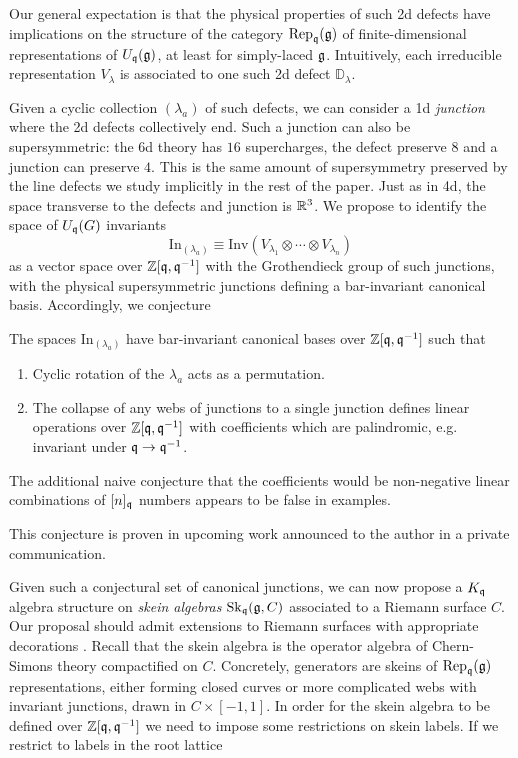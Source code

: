 \documentclass[12pt]{amsart}
\begin{document}
Our general expectation is that the physical properties of such 2d defects have implications on the structure of the category $\mathrm{Rep}_{\mathfrak{q}}(\mathfrak{g})$ 
of finite-dimensional representations of $U_{\mathfrak{q}}(\mathfrak{g})$, at least for simply-laced $\mathfrak{g}$. Intuitively, each irreducible representation $V_\lambda$ is associated to one such 2d defect $\mathbb{D}_\lambda$.   

Given a cyclic collection $(\lambda_a)$ of such defects, we can consider a 1d {\it junction} where the 2d defects collectively end. Such a junction can also be supersymmetric: the 6d theory has $16$ supercharges, the defect preserve $8$ and a junction can preserve $4$. This is the same amount of supersymmetry preserved by the line defects we study implicitly in the rest of the paper. Just as in 4d, the space transverse to the 
defects and junction is $\mathbb{R}^3$. We propose to identify the space of $U_{\mathfrak{q}}(G)$ invariants
\begin{equation}
	\mathrm{In}_{(\lambda_a)} \equiv \mathrm{Inv}\left(V_{\lambda_1} \otimes \cdots \otimes V_{\lambda_n} \right)
\end{equation}
as a vector space over $\mathbb{Z}[\mathfrak{q},\mathfrak{q}^{-1}]$ with the Grothendieck group of such junctions, with the physical supersymmetric junctions 
defining a bar-invariant canonical basis. Accordingly, we conjecture
\begin{conjecture}\label{conj:junctions}
The spaces $\mathrm{In}_{(\lambda_a)}$ have bar-invariant canonical bases over $\mathbb{Z}[\mathfrak{q},\mathfrak{q}^{-1}]$ such that 
\begin{enumerate}
	\item Cyclic rotation of the $\lambda_a$ acts as a permutation.
	\item The collapse of any webs of junctions to a single junction defines linear operations over $\mathbb{Z}[\mathfrak{q},\mathfrak{q}^{-1}]$ with coefficients which are palindromic, e.g. invariant under $\mathfrak{q} \to \mathfrak{q}^{-1}$. 
\end{enumerate}
\end{conjecture}
\begin{remark} The additional naive conjecture that the coefficients would be non-negative linear combinations of $[n]_{\mathfrak{q}}$ numbers appears to be false
in examples. \end{remark}
\begin{remark} This conjecture is proven in upcoming work \cite{BK} announced to the author in a private communication.\end{remark}
Given such a conjectural set of canonical junctions, we can now propose a $K_{\mathfrak{q}}$ algebra structure on {\it skein algebras} $\mathrm{Sk}_{\mathfrak{q}}(\mathfrak{g},C)$ associated to a Riemann surface $C$. Our proposal should admit extensions to Riemann surfaces with appropriate decorations \cite{Jordan:2021hop}. Recall that the skein algebra is the operator algebra of Chern-Simons theory compactified on $C$. Concretely, generators are skeins of  $\mathrm{Rep}_{\mathfrak{q}}(\mathfrak{g})$ representations, either forming closed curves or more complicated webs with invariant junctions, drawn in $C \times [-1,1]$. In order for the skein algebra to be defined over $\mathbb{Z}[\mathfrak{q},\mathfrak{q}^{-1}]$ we need to impose some restrictions on skein labels. If we restrict to labels in the root lattice 
\end{document}
